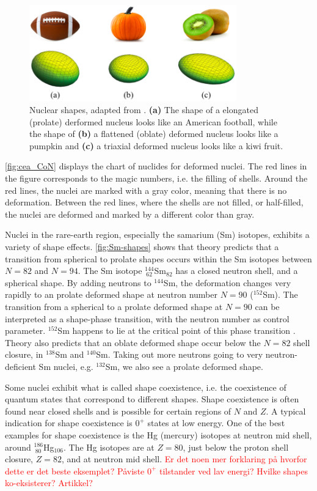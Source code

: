 \documentclass[twoside,english]{uiofysmaster/uiofysmaster}
\let\orgautoref\autoref
\renewcommand{\autoref}
        {%
		 \def\sectionautorefname{Section}%
		 \def\subsectionautorefname{Section}%
		 \def\subsubsectionautorefname{Section}%
		 \def\chapterautorefname{Chapter}%
          \orgautoref}
\begin{document}
\begin{figure}[htb]
	\centering
	\includegraphics[width=0.8\textwidth]{Images/nuclear-shapes-v2.png}
	\caption{Nuclear shapes, adapted from \cite{MSU-shapes}. 
	\textbf{(a)} The shape of a elongated (prolate) derformed nucleus looks like an American football, while the shape of \textbf{(b)} a flattened (oblate) deformed nucleus looks like a pumpkin and \textbf{(c)} a triaxial deformed nucleus looks like a kiwi fruit.}
	\label{fig:Nuclear-shapes}
\end{figure}


\autoref{fig:cea_CoN} displays the chart of nuclides for deformed nuclei. 
The red lines in the figure corresponds to the magic numbers, i.e. the filling of shells. 
Around the red lines, the nuclei are marked with a gray color, meaning that there is no deformation. 
Between the red lines, where the shells are not filled, or half-filled, the nuclei are deformed and marked by a different color than gray. 

Nuclei in the rare-earth region, especially the samarium (Sm) isotopes, exhibits a variety of shape effects. 
\autoref{fig:Sm-shapes} shows that theory predicts that a transition from spherical to prolate shapes occurs within the Sm isotopes between $N = 82$ and $N = 94$.
The Sm isotope $^{144}_{~62}$Sm$_{82}$ has a closed neutron shell, and a spherical shape.
By adding neutrons to $^{144}$Sm, the deformation changes very rapidly to an prolate deformed shape at neutron number $N = 90$ ($^{152}$Sm). 
The transition from a spherical to a prolate deformed shape at $N = 90$ can be interpreted as a shape-phase transition, with the neutron number as control parameter. 
$^{152}$Sm happens to lie at the critical point of this phase transition \cite{Casten2001}.
Theory also predicts that an oblate deformed shape occur below the $N = 82$ shell closure, in $^{138}$Sm and $^{140}$Sm. 
Taking out more neutrons going to very neutron-deficient Sm nuclei, e.g. $^{132}$Sm, we also see a prolate deformed shape. 

Some nuclei exhibit what is called shape coexistence, i.e. the coexistence of quantum states that correspond to different shapes.
Shape coexistence is often found near closed shells and is possible for certain regions of $N$ and $Z$.
A typical indication for shape coexistence is $0^+$ states at low energy. 
One of the best examples for shape coexistence is the Hg (mercury) isotopes at neutron mid shell, around $^{186}_{~80}$Hg$_{106}$. 
The Hg isotopes are at $Z = 80$, just below the proton shell closure, $Z = 82$, and at neutron mid shell.
\textcolor{red}{Er det noen mer forklaring på hvorfor dette er det beste eksemplet? Påviste $0^+$ tilstander ved lav energi? Hvilke shapes ko-eksisterer? Artikkel?}
\end{document}
